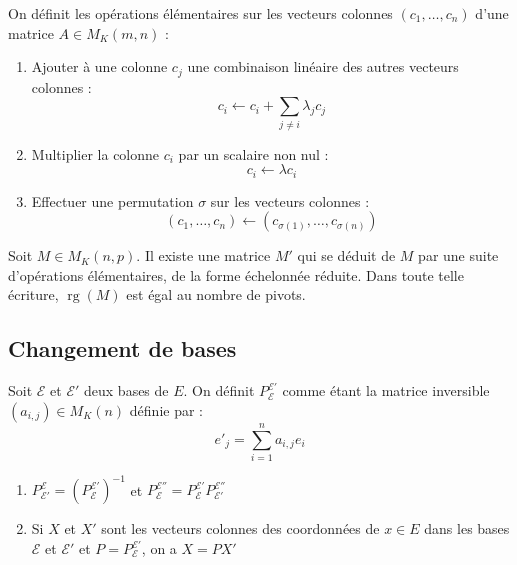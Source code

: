 \begin{de}
On définit les opérations élémentaires sur les vecteurs colonnes $(c_1,\ldots,c_n)$ d'une matrice $A \in M_K(m,n)$ :
\begin{enumerate}
\item Ajouter à une colonne $c_j$ une combinaison linéaire des autres vecteurs colonnes :
\[ c_i \leftarrow c_i + \sum_{j\neq i} \lambda_j c_j \]
\item Multiplier la colonne $c_i$ par un scalaire non nul :
\[ c_i \leftarrow \lambda c_i \]
\item Effectuer une permutation $\sigma$ sur les vecteurs colonnes :
\[ (c_1,\ldots,c_n) \leftarrow (c_{\sigma(1)},\ldots,c_{\sigma(n)}) \]
\end{enumerate}
\end{de}

\begin{thm}
Soit $M \in M_K(n,p)$. Il existe une matrice $M'$ qui se déduit de $M$ par une suite d'opérations élémentaires, de la forme échelonnée réduite. Dans toute telle écriture, $\operatorname{rg}(M)$ est égal au nombre de pivots.
\end{thm}

\subsection{Changement de bases}

\begin{de}
Soit $\mathcal{E}$ et $\mathcal{E}'$ deux bases de $E$. On définit $P_\mathcal{E}^{\mathcal{E}'}$ comme étant la matrice inversible $(a_{i,j}) \in M_K(n)$ définie par :
\[ e'_j = \sum_{i=1}^n a_{i,j}e_i \]
\end{de}

\begin{thm}
\begin{enumerate}
\item $P_{\mathcal{E}'}^\mathcal{E} = (P_\mathcal{E}^{\mathcal{E}'})^{-1}$ et $P_\mathcal{E}^{\mathcal{E}''} = P_\mathcal{E}^{\mathcal{E}'}P_{\mathcal{E}'}^{\mathcal{E}''}$
\item Si $X$ et $X'$ sont les vecteurs colonnes des coordonnées de $x \in E$ dans les bases $\mathcal{E}$ et $\mathcal{E}'$ et $P = P_\mathcal{E}^{\mathcal{E}'}$, on a $X = PX'$
\end{enumerate}
\end{thm}

